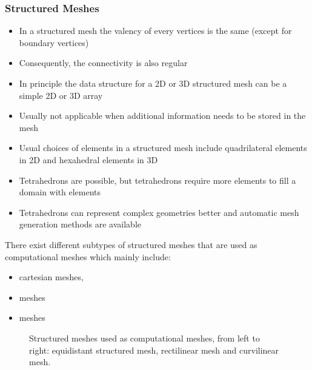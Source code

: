 \begin{frame}
\frametitle{Structured Meshes}
\begin{itemize}
\item In a structured mesh the valency of every vertices is the same (except for boundary vertices)
\item Consequently, the connectivity is also regular
\item In principle the data structure for a 2D or 3D structured mesh can be a simple 2D or 3D array 
\item Usually not applicable when additional information needs to be stored in the mesh
\item Usual choices of elements in a structured mesh include quadrilateral elements in 2D and hexahedral elements in 3D 
\item Tetrahedrons are possible, but tetrahedrons require more elements to fill a domain with elements
\item Tetrahedrons can represent complex geometries better and automatic mesh generation methods are available
\end{itemize}
\end{frame}

\begin{frame}
There exist different subtypes of structured meshes that are used as computational meshes which mainly include:
\begin{itemize}
\item {} cartesian meshes,
\item {} meshes
\item {} meshes 
\end{itemize}
\begin{figure}[h!]
\centering
{}\hspace{0.2cm}
\hspace{0.2cm}
\caption{Structured meshes used as computational meshes, from left to \\ right: equidistant structured mesh, rectilinear mesh and curvilinear mesh.}
\label{fig:structured}
\end{figure}
\end{frame}

